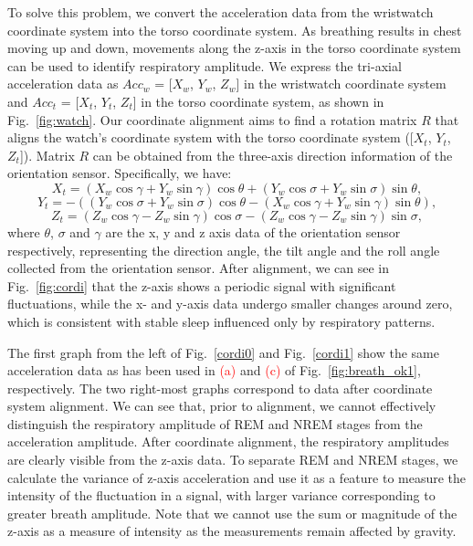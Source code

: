 To solve this problem, we convert the acceleration data from the wristwatch coordinate system into the torso coordinate system. {As breathing results in chest moving up and down, movements along the z-axis in the torso coordinate system can be used to identify respiratory amplitude}. We express the tri-axial acceleration data as $Acc_w$ = [$X_w$, $Y_w$, $Z_w$] in the wristwatch coordinate system and $Acc_t$ = [$X_t$, $Y_t$, $Z_t$] in the torso coordinate system, as shown in Fig.~\ref{fig:watch}.  {Our coordinate alignment aims to find a rotation matrix $R$ that aligns the watch's coordinate system with the torso coordinate system ({[$X_t$, $Y_t$, $Z_t$]}). Matrix $R$ can be obtained from the three-axis direction information of the orientation sensor. Specifically, we have:}
\begin{equation}
      X_t  = (X_w {\cos\gamma} + Y_w{\sin\gamma}){\cos\theta} + (Y_w\cos\sigma + Y_w\sin\sigma)\sin\theta,
\end{equation}
\begin{equation}
      Y_t = -((Y_w\cos\sigma + Y_w\sin\sigma)\cos\theta - (X_w\cos\gamma + Y_w\sin\gamma)\sin\theta),
\end{equation}
\begin{equation}
      Z_t = (Z_w\cos\gamma - Z_w\sin\gamma)\cos\sigma - (Z_w\cos\gamma - Z_w\sin\gamma)\sin\sigma,
\end{equation}
where $\theta$, $\sigma$ and $\gamma$ are the x, y and z axis data of the orientation sensor respectively, representing the direction angle, the tilt angle and the roll angle collected from the orientation sensor. After alignment, we can see in Fig.~\ref{fig:cordi} that the z-axis shows a periodic signal with significant fluctuations, {while the x- and y-axis data undergo smaller changes around zero, which is consistent with stable sleep influenced only by respiratory patterns.}

The first graph from the left of Fig.~\ref{cordi0} and Fig.~\ref{cordi1} show the same acceleration data as has been used in \textcolor{red}{(a)} and \textcolor{red}{(c)} of
Fig.~\ref{fig:breath_ok1}, respectively. The two right-most graphs correspond to data after coordinate system alignment.  We can see that,
prior to alignment, we cannot effectively distinguish the respiratory amplitude of REM and NREM stages from the acceleration amplitude.
After coordinate alignment, the respiratory amplitudes are clearly visible from the z-axis data. {To separate REM and NREM stages,} we
calculate the variance of z-axis acceleration and use it as a feature to measure the intensity of the fluctuation in a signal, with larger
variance corresponding to greater breath amplitude. Note that we cannot use the sum or magnitude of the z-axis as a measure of intensity as
the measurements remain affected by gravity.

